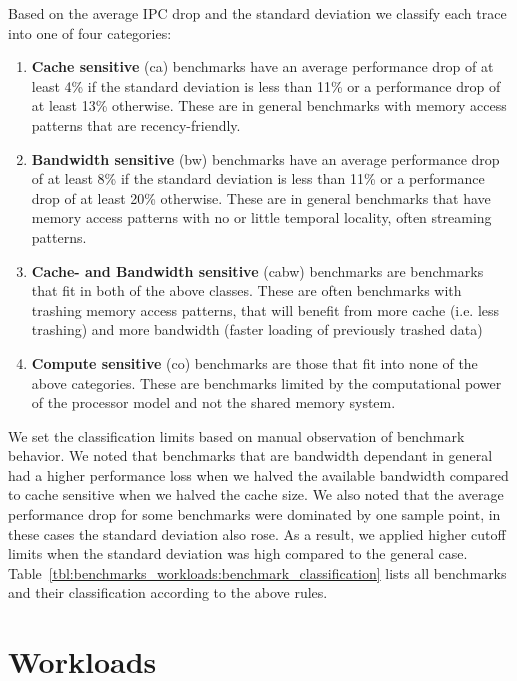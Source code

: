 Based on the average IPC drop and the standard deviation we classify each trace into one of four categories:
\begin{enumerate}

\item \textbf{Cache sensitive} (ca) benchmarks have an average performance drop of at least 4\% if the standard deviation is less than 11\% or a performance drop of at least 13\% otherwise. These are in general benchmarks with memory access patterns that are recency-friendly.

\item \textbf{Bandwidth sensitive} (bw) benchmarks have an average performance drop of at least 8\% if the standard deviation is less than 11\% or a performance drop of at least 20\% otherwise. These are in general benchmarks that have memory access patterns with no or little temporal locality, often streaming patterns.

\item \textbf{Cache- and Bandwidth sensitive} (cabw) benchmarks are benchmarks that fit in both of the above classes. These are often benchmarks with trashing memory access patterns, that will benefit from more cache (i.e. less trashing) and more bandwidth (faster loading of previously trashed data)

\item \textbf{Compute sensitive} (co) benchmarks are those that fit into none of the above categories. These are benchmarks limited by the computational power of the processor model and not the shared memory system.

\end{enumerate}

We set the classification limits based on manual observation of benchmark behavior. 
We noted that benchmarks that are bandwidth dependant in general had a higher performance loss when we halved the available bandwidth compared to cache sensitive when we halved the cache size.
We also noted that the average performance drop for some benchmarks were dominated by one sample point, in these cases the standard deviation also rose. 
As a result, we applied higher cutoff limits when the standard deviation was high compared to the general case.
Table~\ref{tbl:benchmarks_workloads:benchmark_classification} lists all benchmarks and their classification according to the above rules.



\section{Workloads}



